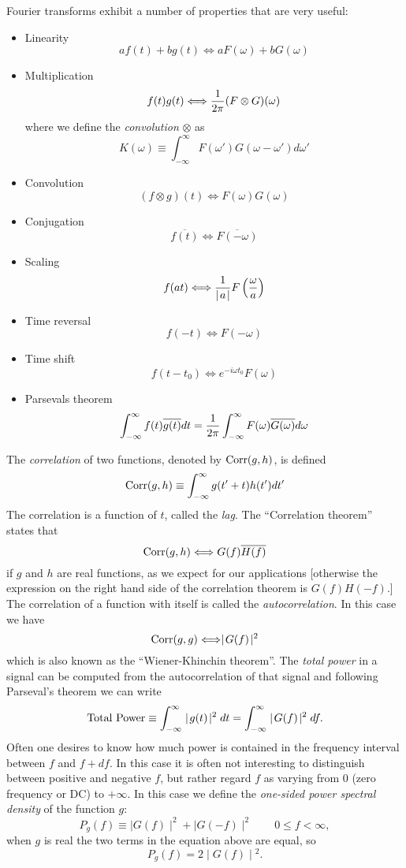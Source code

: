 \documentclass{article}
\newcommand{\infint}{\int_{-\infty}^{\infty}}
\def\labs{\mid\!}
\def\rabs{\!\mid}
\begin{document}
Fourier transforms exhibit a number of properties that are very
useful:
\begin{itemize}
\item Linearity \[ af(t)+bg(t)\Longleftrightarrow
  aF(\omega)+bG(\omega) \]
\item Multiplication \[ f(t)g(t)\Longleftrightarrow{1\over
    2\pi}(F\otimes G)(\omega) \]
where we define the {\it convolution} $\otimes$ as \[
K(\omega)\equiv\infint F(\omega')G(\omega-\omega')d\omega' \]
\item Convolution \[ (f\otimes g)(t)\Longleftrightarrow
  F(\omega)G(\omega) \]
\item Conjugation \[ \overline{f(t)}\Longleftrightarrow\overline{F(-\omega)} \]
\item Scaling \[ f(at) \Longleftrightarrow {1\over
    \labs a\rabs}F\left({\omega\over a}\right) \]
 \item Time reversal \[ f(-t) \Longleftrightarrow F(-\omega) \]
\item Time shift \[ f(t-t_0) \Longleftrightarrow e^{-i\omega
    t_0}F(\omega) \]
\item Parsevals theorem \[ \infint f(t)\overline{g(t)}dt = {1\over
    2\pi}\infint F(\omega)\overline{G(\omega)}d\omega \]
\end{itemize}

The {\it correlation} of two functions, denoted by ${\rm Corr}(g,h)$, is defined
\[
{\rm Corr}(g,h)\equiv\int_{-\infty}^\infty g(t'+t)h(t')dt'
\]
The correlation is a function of $t$, called the {\it lag}. The ``Correlation theorem'' states that 
\[ {\rm Corr}(g,h) \Longleftrightarrow  G(f)\overline{H(f)} \]
if $g$ and $h$ are real functions, as we expect for our applications [otherwise the expression on 
the right hand side of the correlation theorem is $G(f)H(-f)$.] The correlation of a function with itself is called the {\it autocorrelation}. In this case we have 
\[ {\rm Corr}(g,g) \Longleftrightarrow  \labs G(f)\rabs^2 \]
which is also known as the ``Wiener-Khinchin theorem''. The {\it total power} in a signal
can be computed from the autocorrelation of that signal and following Parseval's theorem
we can write
\[ {\rm Total~Power}\equiv\int_{-\infty}^{\infty}\labs g(t)\rabs^2dt
  =\int_{-\infty}^{\infty}\labs G(f)\rabs^2df.
\]
Often one desires to know how much power is contained in the frequency interval between $f$ and $f+df$. In this case it is often not
interesting to distinguish  between positive and negative $f$, but rather regard $f$ as varying from $0$ (zero frequency or DC) to $+\infty$. In this case we define the {\it one-sided power spectral density} of the function $g$:
\[ P_g(f) \equiv \labs G(f)\rabs^2+\labs G(-f)\rabs^2\qquad 0\le f<\infty,\]
when $g$ is real the two terms in the equation above are equal, so 
\[ P_g(f)=2\rabs G(f)\labs^2.\]
\end{document}
